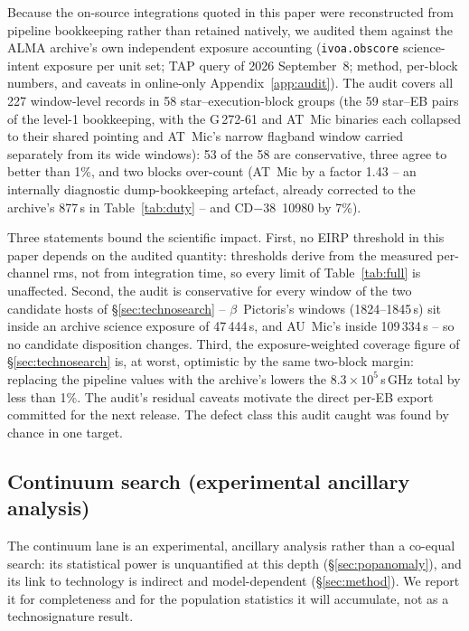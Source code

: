 \documentclass{openjournal}
\begin{document}
Because the on-source integrations quoted in this paper were
reconstructed from pipeline bookkeeping rather than retained natively,
we audited them against the ALMA archive's own independent exposure
accounting (\texttt{ivoa.obscore} science-intent exposure per unit
set; TAP query of 2026 September~8; method, per-block numbers, and
caveats in online-only Appendix~\ref{app:audit}). The audit covers all
227 window-level records in 58 star--execution-block groups (the 59
star--EB pairs of the level-1 bookkeeping, with the G\,272-61 and
AT~Mic binaries each collapsed to their shared pointing and AT~Mic's
narrow flagband window carried separately from its wide windows): 53
of the 58 are conservative, three agree to better than 1\%, and two
blocks over-count (AT~Mic by a factor 1.43 -- an internally diagnostic
dump-bookkeeping artefact, already corrected to the archive's 877\,s in
Table~\ref{tab:duty} -- and CD$-$38~10980 by 7\%).

Three statements bound the scientific impact. First, no EIRP threshold
in this paper depends on the audited quantity: thresholds derive from
the measured per-channel rms, not from integration time, so every
limit of Table~\ref{tab:full} is unaffected. Second, the audit is
conservative for every window of the two candidate hosts of
\S\ref{sec:technosearch} -- $\beta$~Pictoris's windows (1824--1845\,s)
sit inside an archive science exposure of 47\,444\,s, and AU~Mic's
inside 109\,334\,s -- so no candidate disposition changes. Third, the
exposure-weighted coverage figure of \S\ref{sec:technosearch} is, at
worst, optimistic by the same two-block margin: replacing the pipeline
values with the archive's lowers the $8.3\times10^{5}$\,s\,GHz total
by less than 1\%. The audit's residual caveats motivate the direct
per-EB export committed for the next release. The defect class this
audit caught was found by chance in one target.


\subsection{Continuum search (experimental ancillary analysis)}
\label{sec:continuum}

The continuum lane is an experimental, ancillary analysis rather than
a co-equal search: its statistical power is unquantified at this depth
(\S\ref{sec:popanomaly}), and its link to technology is indirect and
model-dependent (\S\ref{sec:method}). We report it for completeness and
for the population statistics it will accumulate, not as a
technosignature result.
\end{document}
